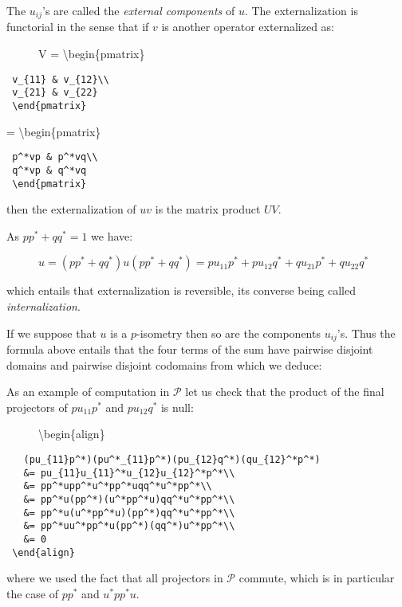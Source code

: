 The \(u_{ij}\)'s are called the \emph{external components} of \(u\). The
externalization is functorial in the sense that if \(v\) is another
operator externalized as:

\begin{description}
\item[]
V = \textbackslash{}begin\{pmatrix\}
\end{description}

\texttt{~v\_\{11\}~\&~v\_\{12\}\textbackslash{}\textbackslash{}}\\
\texttt{~v\_\{21\}~\&~v\_\{22\}}\\
\texttt{~\textbackslash{}end\{pmatrix\}~}

= \textbackslash{}begin\{pmatrix\}

\texttt{~p\^{}*vp~\&~p\^{}*vq\textbackslash{}\textbackslash{}}\\
\texttt{~q\^{}*vp~\&~q\^{}*vq}\\
\texttt{~\textbackslash{}end\{pmatrix\}}

 then the externalization of \(uv\) is the matrix product \(UV\).

As \(pp^* + qq^* = 1\) we have:

\begin{description}
\item[]
\(u = (pp^*+qq^*)u(pp^*+qq^*) = pu_{11}p^* + pu_{12}q^* + qu_{21}p^* + qu_{22}q^*\)
\end{description}

which entails that externalization is reversible, its converse being
called \emph{internalization}.

If we suppose that \(u\) is a \(p\)-isometry then so are the components
\(u_{ij}\)'s. Thus the formula above entails that the four terms of the
sum have pairwise disjoint domains and pairwise disjoint codomains from
which we deduce:

As an example of computation in \(\mathcal{P}\) let us check that the
product of the final projectors of \(pu_{11}p^*\) and \(pu_{12}q^*\) is
null:

\begin{description}
\item[]
\textbackslash{}begin\{align\}
\end{description}

\texttt{~~~(pu\_\{11\}p\^{}*)(pu\^{}*\_\{11\}p\^{}*)(pu\_\{12\}q\^{}*)(qu\_\{12\}\^{}*p\^{}*)}\\
\texttt{~~~\&=~pu\_\{11\}u\_\{11\}\^{}*u\_\{12\}u\_\{12\}\^{}*p\^{}*\textbackslash{}\textbackslash{}}\\
\texttt{~~~\&=~pp\^{}*upp\^{}*u\^{}*pp\^{}*uqq\^{}*u\^{}*pp\^{}*\textbackslash{}\textbackslash{}}\\
\texttt{~~~\&=~pp\^{}*u(pp\^{}*)(u\^{}*pp\^{}*u)qq\^{}*u\^{}*pp\^{}*\textbackslash{}\textbackslash{}}\\
\texttt{~~~\&=~pp\^{}*u(u\^{}*pp\^{}*u)(pp\^{}*)qq\^{}*u\^{}*pp\^{}*\textbackslash{}\textbackslash{}}\\
\texttt{~~~\&=~pp\^{}*uu\^{}*pp\^{}*u(pp\^{}*)(qq\^{}*)u\^{}*pp\^{}*\textbackslash{}\textbackslash{}}\\
\texttt{~~~\&=~0}\\
\texttt{~\textbackslash{}end\{align\}}

where we used the fact that all projectors in \(\mathcal{P}\) commute,
which is in particular the case of \(pp^*\) and \(u^*pp^*u\).


